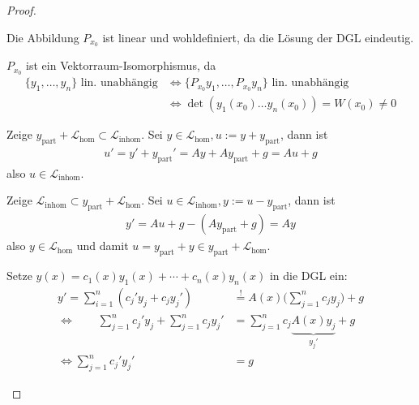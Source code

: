 \begin{theorem}[Satz]
\begin{proof}
\begin{enum-arab}
\begin{enum-alph}
				Die Abbildung $P_{x_0}$ ist linear und wohldefiniert, da die Lösung der DGL eindeutig.
			\item
				$P_{x_0}$ ist ein Vektorraum-Isomorphismus, da
				\begin{align*}
					\{y_1, \dotsc, y_n\} \text{ lin. unabhängig}
					& \iff \{P_{x_0} y_1, \dotsc, P_{x_0} y_n \} \text{ lin. unabhängig} \\
					& \iff \det(y_1(x_0) \dotso y_n(x_0)) = W(x_0) \neq 0
				\end{align*}
          \end{enum-alph}
      \item
          \begin{enum-alph}

			\item
				Zeige $y_{\text{part}} + \mathcal L_{\text{hom}} \subset \mathcal L_{\text{inhom}}$.
				Sei $y \in \mathcal L_{\text{hom}}, u := y + y_{\text{part}}$, dann ist
				\begin{align*}
					u' = y' + y_{\text{part}}' = Ay + Ay_{\text{part}} + g = Au + g
				\end{align*}
				also $u \in \mathcal L_{\text{inhom}}$.

				Zeige $\mathcal L_{\text{inhom}} \subset y_{\text{part}} + \mathcal L_{\text{hom}}$.
				Sei $u \in \mathcal L_{\text{inhom}}, y := u - y_{\text{part}}$, dann ist
				\begin{align*}
					y' = Au + g - (A y_{\text{part}} + g) = Ay
				\end{align*}
				also $y \in \mathcal L_{\text{hom}}$ und damit $u = y_{\text{part}} + y \in y_{\text{part}} + \mathcal L_{\text{hom}}$.
			\item
				Setze $y(x) = c_1(x) y_1(x) + \dotsb + c_n(x) y_n(x)$ in die DGL ein:
				\begin{align*}
					y' = \sum_{i=1}^n (c_j' y_j + c_j y_j') &\stackrel != A(x) \bigg( \sum_{j=1}^n c_j y_j \bigg) + g \\
					\iff \qquad \sum_{j=1}^n c_j'y_j + \sum_{j=1}^n c_j y_j' &= \sum_{j=1}^n c_j \underbrace{A(x) y_j}_{y_j'} + g \\
					\iff \sum_{j=1}^n c_j' y_j' &= g
				\end{align*}
           \end{enum-alph}
		\end{enum-arab}
	\end{proof}
\end{theorem}

